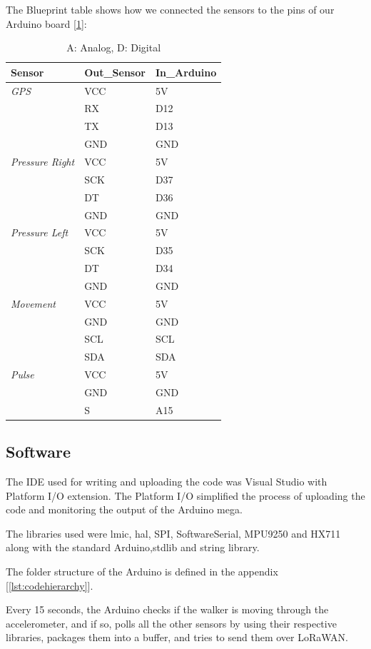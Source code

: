 		The Blueprint table shows how we connected the sensors to the pins of our Arduino board [\ref{tab:blueprintArduino}]:
		\begin{table}[h!]
			\centering
			\begin{tabular}{l|ll}
				\textbf{Sensor} & \textbf{Out\_Sensor} & \textbf{In\_Arduino} \\\hline
				\textit{GPS} & VCC & 5V \\
				& RX & D12 \\
				& TX & D13 \\
				& GND & GND \\\hline
				\textit{Pressure Right} & VCC & 5V \\
				& SCK & D37 \\
				& DT & D36 \\
				& GND & GND \\\hline
				\textit{Pressure Left} & VCC & 5V \\
				& SCK & D35 \\
				& DT & D34 \\
				& GND & GND \\\hline
				\textit{Movement} & VCC & 5V \\
				& GND & GND \\
				& SCL & SCL \\
				& SDA & SDA \\\hline
				\textit{Pulse} & VCC & 5V \\
				& GND & GND \\
				& S & A15 
			\end{tabular}
			\caption[Blueprint connections node]{A: Analog, D: Digital}
			\label{tab:blueprintArduino}
		\end{table}

	\subsection{Software}
		The IDE used for writing and uploading the code was Visual Studio with Platform I/O extension. The Platform I/O simplified the process of uploading the code and monitoring the output of the Arduino mega.

		The libraries used were lmic, hal, SPI, SoftwareSerial, MPU9250 and HX711 along with the standard Arduino,stdlib and string library.

		The folder structure of the Arduino is defined in the appendix [\ref{lst:codehierarchy}]. 

		Every 15 seconds, the Arduino checks if the walker is moving through the accelerometer, and if so, polls all the other sensors by using their respective libraries, packages them into a buffer, and tries to send them over LoRaWAN.

